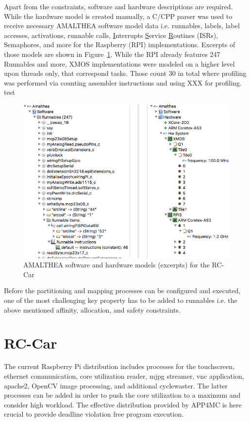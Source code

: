 \documentclass [a4paper,final,conference,10pt]{IDAACS}
\begin{document}
Apart from the constraints, software and hardware descriptions are required. While the hardware model is created manually, a C/CPP parser was used to receive necessary AMALTHEA software model data i.e. runnables, labels, label accesses, activations, runnable calls, \underline{I}nterrupts \underline{S}ervice \underline{R}outines (ISRs), Semaphores, and more for the Raspberry (RPI) implementations. Excerpts of those models are shown in Figure~\ref{fig:model}. While the RPI already features 247 Runnables and more, XMOS implementations were modeled on a higher level upon threads only, that correspond tasks. Those count 30 in total where profiling was performed via counting assembler instructions and using XXX for profiling.
test
\begin{figure}[bth]
	\centering
	\includegraphics[scale=0.3]{images/models.png}
	\caption{\label{fig:model}AMALTHEA software and hardware models (excerpts) for the RC-Car}
\end{figure}
Before the partitioning and mapping processes can be configured and executed, one of the most challenging key property has to be added to runnables i.e. the above mentioned affinity, allocation, and safety constraints.
\section{RC-Car}
\label{sec:rccar}
The current Raspberry Pi distribution includes processes for the touchscreen, ethernet communication, core utilization reader, mjpg streamer, vnc application, apache2, OpenCV image processing, and additional cyclewaster. The latter processes can be added in order to push the core utilization to a maximum and consider high workload. The effective distribution provided by APP4MC is here crucial to provide deadline violation free program execution. 
\end{document}
